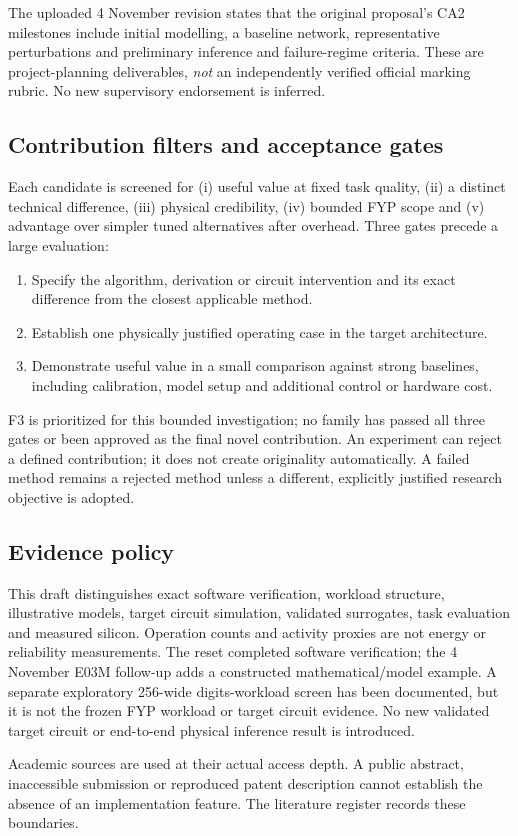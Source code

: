 The uploaded 4 November revision states that the original proposal's CA2 milestones
include initial modelling, a baseline network, representative perturbations and
preliminary inference and failure-regime criteria. These are project-planning
deliverables, \emph{not} an independently verified official marking rubric.
No new supervisory endorsement is inferred.

\subsection{Contribution filters and acceptance gates}

Each candidate is screened for (i) useful value at fixed task quality, (ii) a distinct
technical difference, (iii) physical credibility, (iv) bounded FYP scope and (v) advantage
over simpler tuned alternatives after overhead. Three gates precede a large evaluation:
\begin{enumerate}
\item Specify the algorithm, derivation or circuit intervention and its exact difference
from the closest applicable method.
\item Establish one physically justified operating case in the target architecture.
\item Demonstrate useful value in a small comparison against strong baselines, including
calibration, model setup and additional control or hardware cost.
\end{enumerate}
F3 is prioritized for this bounded investigation; no family has passed all three gates or been approved as the final novel contribution. An experiment can reject a defined contribution;
it does not create originality automatically. A failed method remains a rejected method
unless a different, explicitly justified research objective is adopted.

\subsection{Evidence policy}

This draft distinguishes exact software verification, workload structure, illustrative
models, target circuit simulation, validated surrogates, task evaluation and measured
silicon. Operation counts and activity proxies are not energy or reliability measurements.
The reset completed software verification; the 4 November E03M follow-up adds a
constructed mathematical/model example. A separate exploratory 256-wide digits-workload screen has been documented, but it is
not the frozen FYP workload or target circuit evidence. No new validated target circuit
or end-to-end physical inference result is introduced.

Academic sources are used at their actual access depth. A public abstract, inaccessible
submission or reproduced patent description cannot establish the absence of an
implementation feature. The literature register records these boundaries.

